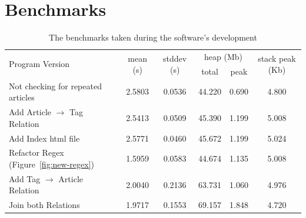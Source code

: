 \documentclass[a4paper]{report}
\begin{document}
\chapter{Benchmarks}\label{app:benches}
\begin{table}[h]
    \begin{tabular}{l c c c c c}
        \multirow{2}{*}{Program Version} & \multirow{2}{*}{mean (s)} &
        \multirow{2}{*}{stddev (s)} & \multicolumn{2}{c}{heap (Mb)} &
        \multirow{2}{*}{stack peak (Kb)}\\

        &    &    & total & peak & \\\toprule

        Not checking for repeated articles
        &2.5803&0.0536&44.220  &0.690  &4.800\\

        Add Article $\to$ Tag Relation
        &2.5413&0.0509&45.390  &1.199  &5.008\\

        Add Index html file
        &2.5771&0.0460&45.672  &1.199  &5.024\\

        Refactor Regex (Figure~\ref{fig:new-regex})
        &1.5959&0.0583&44.674  &1.135  &5.008\\

        Add Tag $\to$ Article Relation
        &2.0040&0.2136&63.731  &1.060  &4.976\\

        Join both Relations
        &1.9717&0.1553&69.157  &1.848  &4.720\\\bottomrule

    \end{tabular}
    \caption{The benchmarks taken during the software's development}
\end{table}
\end{document}
